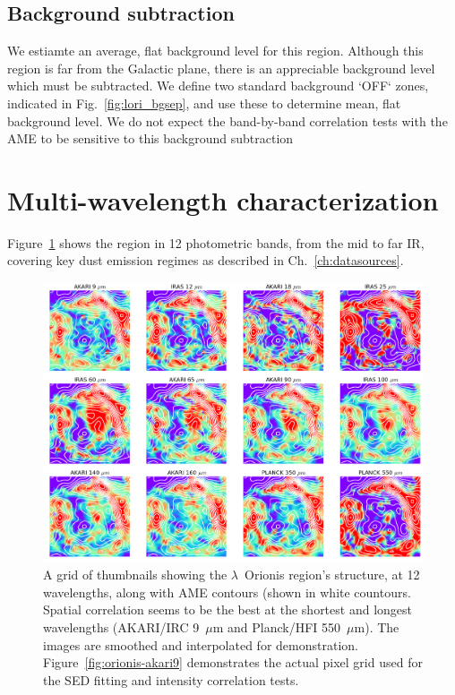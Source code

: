       \subsection{Background subtraction}
         We estiamte an average, flat background level for this region. Although this region is far from the Galactic plane, there is an appreciable background level which must be subtracted. We define two standard background `OFF` zones, indicated in Fig.~\ref{fig:lori_bgsep}, and use these to determine mean, flat background level. We do not expect the band-by-band correlation tests with the AME to be sensitive to this background subtraction

		\section{Multi-wavelength characterization}
			Figure~\ref{fig:orionis-img} shows the region in 12 photometric bands, from the mid to far IR, covering key dust emission regimes as described in Ch.~\ref{ch:datasources}.
        \begin{figure}
          \includegraphics[width=\textwidth]{../Plots/lOrionis_grid_img.png}
          \centering
          \caption{A grid of thumbnails showing the $\lambda$~Orionis region's structure, at 12 wavelengths, along with AME contours (shown in white countours. Spatial correlation seems to be the best at the shortest and longest wavelengths (AKARI/IRC 9~$\mu$m and Planck/HFI 550~$\mu$m). The images are smoothed and interpolated for demonstration. Figure~\ref{fig:orionis-akari9} demonstrates the actual pixel grid used for the SED fitting and intensity correlation tests.}
          \label{fig:orionis-img}
        \end{figure}
